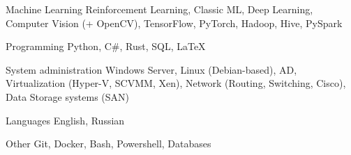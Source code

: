 

\begin{cvskills}

  \cvskill
    {Machine Learning} %
    {Reinforcement Learning, Classic ML, Deep Learning, Computer Vision (+ OpenCV), TensorFlow, PyTorch, Hadoop, Hive, PySpark} %

  \cvskill
    {Programming} %
    {Python, C\#, Rust, SQL, LaTeX} %
    
  \cvskill
	{System administration} %
	{Windows Server, Linux (Debian-based), AD, Virtualization (Hyper-V, SCVMM, Xen), Network (Routing, Switching, Cisco), Data Storage systems (SAN)} %

  \cvskill
    {Languages} %
    {English, Russian} %

  \cvskill
	{Other} %
	{Git, Docker, Bash, Powershell, Databases} %

\end{cvskills}
